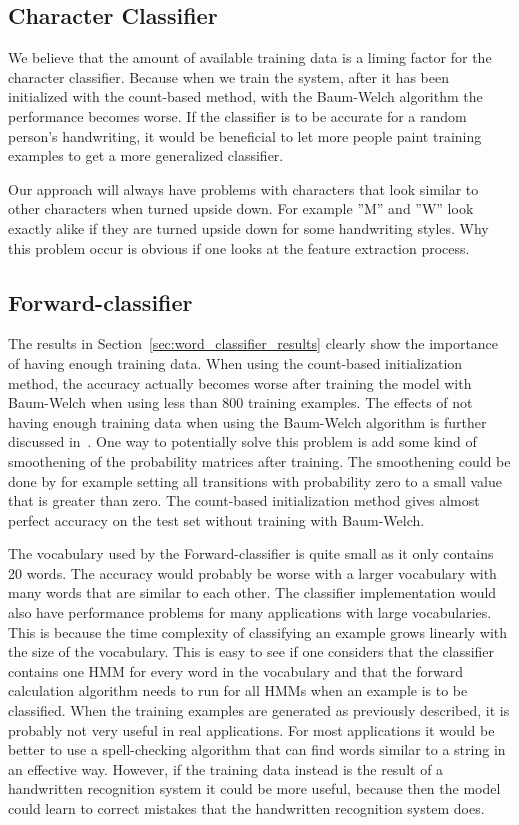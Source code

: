 \subsection{Character Classifier}
We believe that the amount of available training data is a liming factor for the character classifier.
Because when we train the system, after it has been initialized with the count-based method, with the Baum-Welch algorithm the performance becomes worse.
If the classifier is to be accurate for a random person's handwriting, it would be beneficial to let more people paint training examples to get a more generalized classifier.

Our approach will always have problems with characters that look similar to other characters when turned upside down.
For example ''M'' and ''W'' look exactly alike if they are turned upside down for some handwriting styles.
Why this problem occur is obvious if one looks at the feature extraction process.

\subsection{Forward-classifier}
The results in Section~\ref{sec:word_classifier_results} clearly show the importance of having enough training data.
When using the count-based initialization method, the accuracy actually becomes worse after training the model with Baum-Welch when using less than 800 training examples.
The effects of not having enough training data when using the Baum-Welch algorithm is further discussed in~\cite{Rabiner1989}.
One way to potentially solve this problem is add some kind of smoothening of the probability matrices after training.
The smoothening could be done by for example setting all transitions with probability zero to a small value that is greater than zero.
The count-based initialization method gives almost perfect accuracy on the test set without training with Baum-Welch.

The vocabulary used by the Forward-classifier is quite small as it only contains 20 words.
The accuracy would probably be worse with a larger vocabulary with many words that are similar to each other.
The classifier implementation would also have performance problems for many applications with large vocabularies.
This is because the time complexity of classifying an example grows linearly with the size of the vocabulary.
This is easy to see if one considers that the classifier contains one HMM for every word in the vocabulary and that the forward calculation algorithm needs to run for all HMMs when an example is to be classified.
When the training examples are generated as previously described, it is probably not very useful in real applications.
For most applications it would be better to use a spell-checking algorithm that can find words similar to a string in an effective way.
However, if the training data instead is the result of a handwritten recognition system it could be more useful, because then the model could learn to correct mistakes that the handwritten recognition system does.

